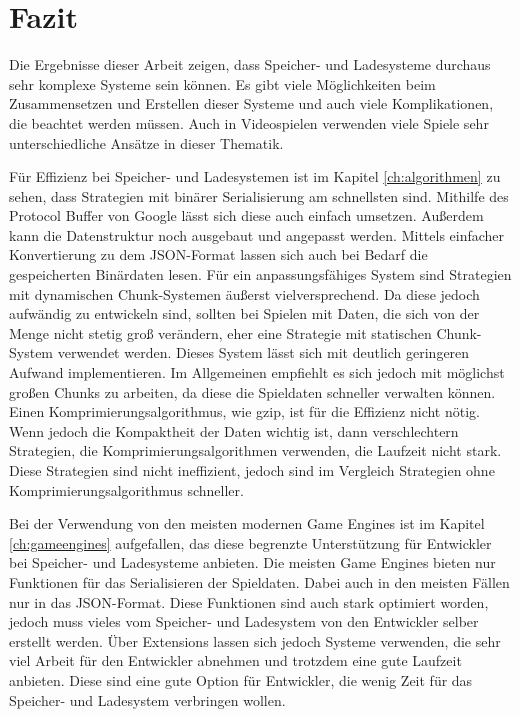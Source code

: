 \chapter{Fazit}\label{ch:fazit}
Die Ergebnisse dieser Arbeit zeigen, dass Speicher- und Ladesysteme durchaus sehr komplexe Systeme sein können. Es gibt viele Möglichkeiten beim Zusammensetzen und Erstellen dieser Systeme und auch viele Komplikationen, die beachtet werden müssen. Auch in Videospielen verwenden viele Spiele sehr unterschiedliche Ansätze in dieser Thematik. 

Für Effizienz bei Speicher- und Ladesystemen ist im Kapitel \ref{ch:algorithmen} zu sehen, dass Strategien mit binärer Serialisierung am schnellsten sind. Mithilfe des Protocol Buffer von Google lässt sich diese auch einfach umsetzen. Außerdem kann die Datenstruktur noch ausgebaut und angepasst werden. Mittels einfacher Konvertierung zu dem JSON-Format lassen sich auch bei Bedarf die gespeicherten Binärdaten lesen. Für ein anpassungsfähiges System sind Strategien mit dynamischen Chunk-Systemen äußerst vielversprechend. Da diese jedoch aufwändig zu entwickeln sind, sollten bei Spielen mit Daten, die sich von der Menge nicht stetig groß verändern, eher eine Strategie mit statischen Chunk-System verwendet werden. Dieses System lässt sich mit deutlich geringeren Aufwand implementieren. Im Allgemeinen empfiehlt es sich jedoch mit möglichst großen Chunks zu arbeiten, da diese die Spieldaten schneller verwalten können. Einen Komprimierungsalgorithmus, wie \ac{gzip}, ist für die Effizienz nicht nötig. Wenn jedoch die Kompaktheit der Daten wichtig ist, dann verschlechtern Strategien, die Komprimierungsalgorithmen verwenden, die Laufzeit nicht stark. Diese Strategien sind nicht ineffizient, jedoch sind im Vergleich Strategien ohne Komprimierungsalgorithmus schneller.

Bei der Verwendung von den meisten modernen Game Engines ist im Kapitel \ref{ch:gameengines} aufgefallen, das diese begrenzte Unterstützung für Entwickler bei Speicher- und Ladesysteme anbieten. Die meisten Game Engines bieten nur Funktionen für das Serialisieren der Spieldaten. Dabei auch in den meisten Fällen nur in das JSON-Format. Diese Funktionen sind auch stark optimiert worden, jedoch muss vieles vom Speicher- und Ladesystem von den Entwickler selber erstellt werden. Über Extensions lassen sich jedoch Systeme verwenden, die sehr viel Arbeit für den Entwickler abnehmen und trotzdem eine gute Laufzeit anbieten. Diese sind eine gute Option für Entwickler, die wenig Zeit für das Speicher- und Ladesystem verbringen wollen.

